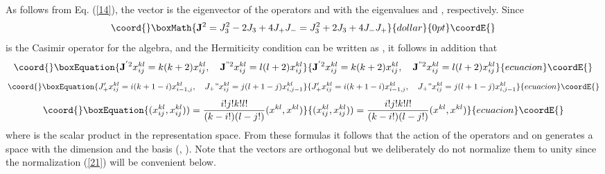 \documentclass[a4paper,12pt]{article}%
\begin{document}
As follows from Eq. (\ref{14}), the vector \coordHE{} is
the eigenvector of the operators \coordHE{} and \coordHE{} with 
the eigenvalues \coordHE{} and \coordHE{}, respectively. 
Since 
$$\coord{}\boxMath{{\bf J}^2=J_3^2-2J_3+4J_+J_-=J_3^2+2J_3+4J_-J_+}{dollar}{0pt}\coordE{}$$
is the Casimir operator for the \coordHE{}  algebra, and the
Hermiticity condition can be written as \coordHE{}, 
it  follows  in  addition that 
\begin{equation}\coord{}\boxEquation{
{\bf J}^{'2}x_{ij}^{kl}=k(k+2)x_{ij}^{kl},\quad
{\bf J}^{"2}x_{ij}^{kl}=l(l+2)x_{ij}^{kl}
\label{19}
}{
{\bf J}^{'2}x_{ij}^{kl}=k(k+2)x_{ij}^{kl},\quad
{\bf J}^{"2}x_{ij}^{kl}=l(l+2)x_{ij}^{kl}
}{ecuacion}\coordE{}\end{equation}
\begin{equation}\coord{}\boxEquation{
J_+'x_{ij}^{kl}=i (k+1-i)x_{i -1,j}^{kl},
\quad  J_+"x_{ij}^{kl}=j (l+1-j)x_{i,j -1}^{kl}
\label{20}
}{
J_+'x_{ij}^{kl}=i (k+1-i)x_{i -1,j}^{kl},
\quad  J_+"x_{ij}^{kl}=j (l+1-j)x_{i,j -1}^{kl}
}{ecuacion}\coordE{}\end{equation}
\begin{equation}\coord{}\boxEquation{
(x_{ij}^{kl},x_{ij}^{kl}))=
\frac{i !j !k!l!}{(k-i !)(l-j !)}(x^{kl},x^{kl})
\label{21}
}{
(x_{ij}^{kl},x_{ij}^{kl}))=
\frac{i !j !k!l!}{(k-i !)(l-j !)}(x^{kl},x^{kl})
}{ecuacion}\coordE{}\end{equation}
where \coordHE{} is the scalar product in the representation space.
From these formulas it follows that the action of 
the operators \coordHE{}
and \coordHE{} on \coordHE{}  generates a space with the  
dimension \coordHE{}  and  the
basis \coordHE{} (\coordHE{}, \coordHE{}).
Note that the vectors \coordHE{}   are
orthogonal but we deliberately do not normalize them to 
unity since the normalization (\ref{21}) will be convenient below.
\end{document}
